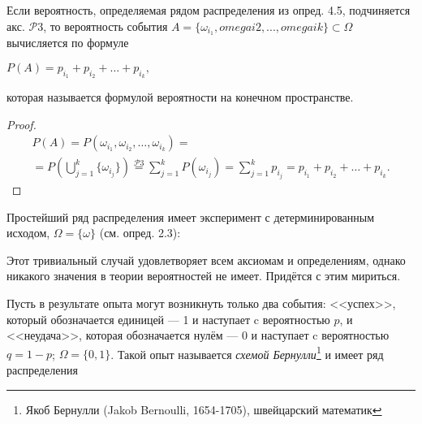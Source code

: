 \begin{deflemma}
	Если  вероятность, определяемая рядом распределения из опред. 4.5, подчиняется акс. $\mathcal{P}3$, то вероятность события $A = \{\omega_{i_1} , omegai2 , . . . , omegaik \} \subset \Omega$ вычисляется по формуле

$P(A) = p_{i_1} + p_{i_2} + \ldots + p_{i_k} ,$

которая называется формулой вероятности на конечном пространстве.
\end{deflemma}
\begin{proof}
 \begin{gather*}
 	P(A) = P (\omega_{i_1} , \omega_{i_2} , \ldots , \omega_{i_k}) =\\= P \left( \bigcup\limits_{j=1}^k \{\omega_{i_j} \} \right) \stackrel{\mathcal{P}3}{=} \sum_{j=1}^{k} P(\omega_{i_j}) = \sum_{j=1}^{k} p_{i_j} = p_{i_1} + p_{i_2} + \ldots + p_{i_k}.
 \end{gather*}
 	
 \end{proof} 

\begin{example}
Простейший ряд распределения имеет эксперимент с детерминированным исходом, $\Omega = \{ \omega \}$ (см. опред. 2.3):


\begin{table}
\end{table}

Этот тривиальный случай удовлетворяет всем аксиомам и определениям, однако никакого значения в теории вероятностей не имеет. Придётся с этим
мириться.
\end{example}

\begin{example}
	Пусть в результате опыта могут возникнуть только
два события: <<успех>>, который обозначается единицей — 1 и наступает c вероятностью $p$, и <<неудача>>, которая обозначается нулём — 0 и наступает c
вероятностью $q = 1−p$; $\Omega = \{0, 1\}$. Такой опыт называется \textit{схемой Бернулли}\footnote{
	Якоб Бернулли (Jakob Bernoulli, 1654-1705), швейцарский математик
}
и имеет ряд распределения

\begin{table}
\end{table}

\end{example}

